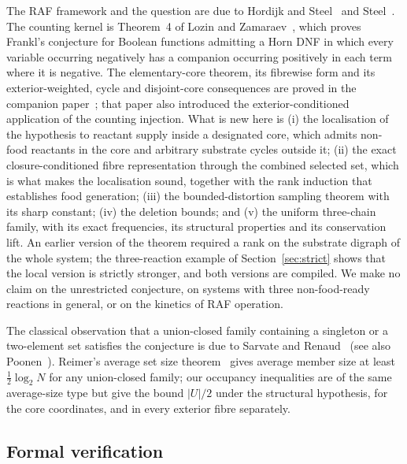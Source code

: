 \documentclass[11pt,a4paper]{article}
\theoremstyle{plain}
\theoremstyle{definition}
\theoremstyle{remark}
\begin{document}
The RAF framework and the question are due to Hordijk and Steel~\cite{hordijk2004detecting} and Steel~\cite{steel2023interior}. The counting kernel is Theorem~4 of Lozin and Zamaraev~\cite{lozin2024union}, which proves Frankl's conjecture for Boolean functions admitting a Horn DNF in which every variable occurring negatively has a companion occurring positively in each term where it is negative. The elementary-core theorem, its fibrewise form and its exterior-weighted, cycle and disjoint-core consequences are proved in the companion paper~\cite{elementary2026}; that paper also introduced the exterior-conditioned application of the counting injection. What is new here is (i) the localisation of the hypothesis to reactant supply inside a designated core, which admits non-food reactants in the core and arbitrary substrate cycles outside it; (ii) the exact closure-conditioned fibre representation through the combined selected set, which is what makes the localisation sound, together with the rank induction that establishes food generation; (iii) the bounded-distortion sampling theorem with its sharp constant; (iv) the deletion bounds; and (v) the uniform three-chain family, with its exact frequencies, its structural properties and its conservation lift. An earlier version of the theorem required a rank on the substrate digraph of the whole system; the three-reaction example of Section~\ref{sec:strict} shows that the local version is strictly stronger, and both versions are compiled. We make no claim on the unrestricted conjecture, on systems with three non-food-ready reactions in general, or on the kinetics of RAF operation.

The classical observation that a union-closed family containing a singleton or a two-element set satisfies the conjecture is due to Sarvate and Renaud~\cite{sarvate1989union} (see also Poonen~\cite{poonen1992union}). Reimer's average set size theorem~\cite{reimer2003average} gives average member size at least $\frac12\log_2N$ for any union-closed family; our occupancy inequalities are of the same average-size type but give the bound $|U|/2$ under the structural hypothesis, for the core coordinates, and in every exterior fibre separately.

\subsection{Formal verification}
\end{document}
